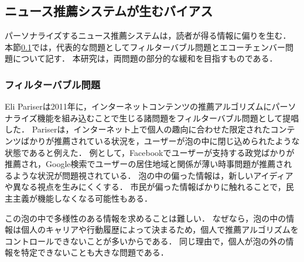 \documentclass[12pt,a4j,dvipdfmx]{jreport}
\begin{document}
\subsection{ニュース推薦システムが生むバイアス}
\label{biases_generated_by_nrs}
パーソナライズするニュース推薦システムは，読者が得る情報に偏りを生む．
本節\ref{biases_generated_by_nrs}では，代表的な問題としてフィルターバブル問題とエコーチェンバー問題について記す．
本研究は，両問題の部分的な緩和を目指すものである．


\subsubsection{フィルターバブル問題}
Eli Pariserは2011年に，インターネットコンテンツの推薦アルゴリズムにパーソナライズ機能を組み込むことで生じる諸問題をフィルターバブル問題として提唱した\cite{pariser_beware_nodate}\cite{bruns_filter_2019}．
Pariserは，インターネット上で個人の趣向に合わせた限定されたコンテンツばかりが推薦されている状況を，ユーザーが泡の中に閉じ込められたような状態であると例えた．
例として，Facebookでユーザーが支持する政党ばかりが推薦され，Google検索でユーザーの居住地域と関係が薄い時事問題が推薦されるような状況が問題視されている．
泡の中の偏った情報は，新しいアイディアや異なる視点を生みにくくする．
市民が偏った情報ばかりに触れることで，民主主義が機能しなくなる可能性もある．

この泡の中で多様性のある情報を求めることは難しい．
なぜなら，泡の中の情報は個人のキャリアや行動履歴によって決まるため，個人で推薦アルゴリズムをコントロールできないことが多いからである．
同じ理由で，個人が泡の外の情報を特定できないことも大きな問題である．

\end{document}
